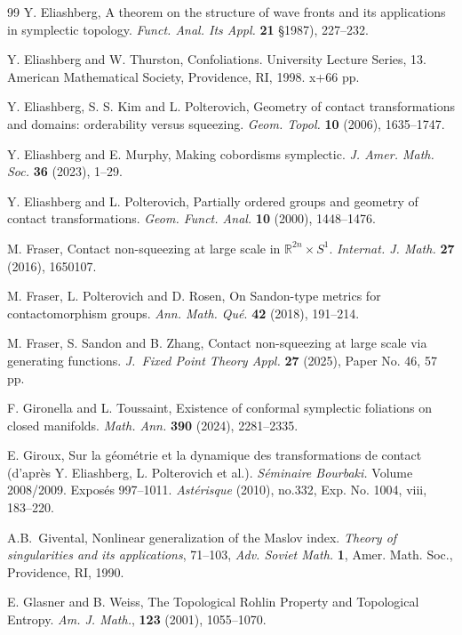 \documentclass{amsart}
\theoremstyle{remark}
\begin{document}
\begin{thebibliography}{99}
 Y. Eliashberg, A theorem on the structure of wave fronts and its applications in symplectic topology. \textit{Funct. Anal. Its Appl.} \textbf{21} §1987), 227--232. 

 Y. Eliashberg and W. Thurston, Confoliations. University Lecture Series, 13. American Mathematical Society, Providence, RI, 1998. x+66 pp.

 Y. Eliashberg, S. S. Kim and L. Polterovich, Geometry of contact transformations and domains: orderability versus squeezing. \textit{Geom. Topol.} \textbf{10} (2006), 1635--1747.

 Y. Eliashberg and E. Murphy, Making cobordisms symplectic. \textit{J. Amer. Math. Soc.} \textbf{36} (2023), 1--29.

 Y. Eliashberg and L. Polterovich, Partially ordered groups and geometry of contact transformations. \textit{Geom. Funct. Anal.} \textbf{10} (2000), 1448--1476.

 M. Fraser, Contact non-squeezing at large scale in $\mathbb{R}^{2n} \times S^1$. \textit{Internat. J. Math.} \textbf{27} (2016), 1650107.

 M. Fraser, L. Polterovich and D. Rosen, On Sandon-type metrics for contactomorphism groups. \textit{Ann. Math. Qu\'e}. \textbf{42} (2018), 191--214.

 M. Fraser, S. Sandon and B. Zhang, Contact non-squeezing at large scale via generating functions. \textit{J.\ Fixed Point Theory Appl.} \textbf{27} (2025), Paper No. 46, 57 pp. 

 F. Gironella and L. Toussaint, Existence of conformal symplectic foliations on closed manifolds. \textit{Math. Ann.} \textbf{390} (2024), 2281--2335.

 E. Giroux, Sur la g\'eom\'etrie et la dynamique des transformations de contact (d'apr\`{e}s Y. Eliashberg, L. Polterovich et al.). \textit{S\'eminaire Bourbaki.} Volume 2008/2009. Expos\'es 997--1011. \textit{Ast\'erisque} (2010), no.332, Exp. No. 1004, viii, 183--220.

 A.B.~Givental, Nonlinear generalization of the Maslov index.  \textit{Theory of singularities and its applications}, 71--103, \textit{Adv. Soviet Math.} \textbf{1}, Amer. Math. Soc., Providence, RI, 1990.

 E. Glasner and B. Weiss, The Topological Rohlin Property and Topological Entropy. \textit{Am. J. Math.}, \textbf{123} (2001), 1055--1070.


\end{thebibliography}
\end{document}
